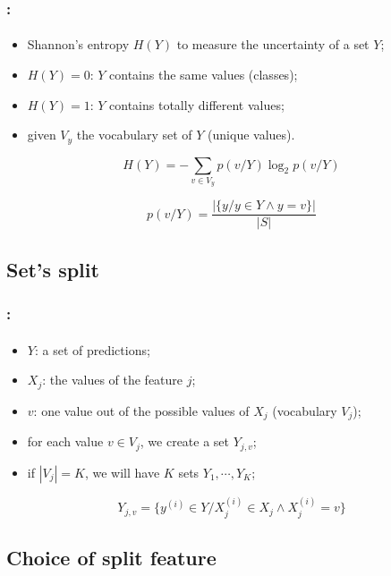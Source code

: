 \documentclass[xcolor=table]{beamer}
\begin{document}
\begin{frame}
	\frametitle{\insertshortsubtitle: \insertsection}
	\framesubtitle{\insertsubsection}
	
	\begin{itemize}
		\item Shannon's entropy $H(Y)$ to measure the uncertainty of a set $Y$;
		\item $H(Y)=0$: $Y$ contains the same values (classes);
		\item $H(Y)=1$: $Y$ contains totally different values;
		\item given $V_y$ the vocabulary set of $Y$ (unique values).
	\end{itemize}

	\[H(Y) = - \sum\limits_{v \in V_y} p(v/Y) \log_2 p(v/Y)\]
	
	\[p(v/Y) = \frac{|\{y / y \in Y \wedge y = v\}|}{|S|}\]
	
\end{frame}

\subsection{Set's split}

\begin{frame}
	\frametitle{\insertshortsubtitle: \insertsection}
	\framesubtitle{\insertsubsection}
	
	\begin{itemize}
		\item $Y$: a set of predictions;
		\item $X_j$: the values of the feature $j$;
		\item $v$: one value out of the possible values of $X_j$ (vocabulary $V_j$);
		\item for each value $v \in V_j$, we create a set $Y_{j, v}$;
		\item if $|V_j| = K$, we will have $K$ sets $Y_1, \cdots, Y_K$;
	\end{itemize}
	
	\[Y_{j,v} = \{y^{(i)} \in Y / X_j^{(i)} \in X_j \wedge X_j^{(i)} = v\}\]

	
\end{frame}

\subsection{Choice of split feature}
\end{document}
